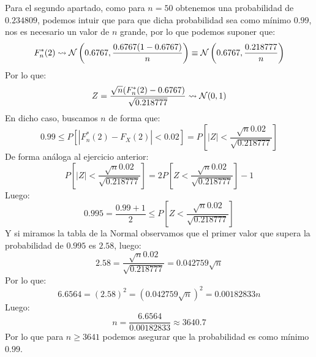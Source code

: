 \begin{ejercicio}
    \noindent
    Para el segundo apartado, como para $n=50$ obtenemos una probabilidad de $0.234809$, podemos intuir que para que dicha probabilidad sea como mínimo $0.99$, nos es necesario un valor de $n$ grande, por lo que podemos suponer que:
    \begin{equation*}
        F_n^\ast(2) \rightsquigarrow \mathcal{N}\left(0.6767, \dfrac{0.6767(1-0.6767)}{n}\right) \equiv \mathcal{N}\left(0.6767, \dfrac{0.218777}{n}\right)
    \end{equation*}
    Por lo que:
    \begin{equation*}
        Z = \dfrac{\sqrt{n}(F_n^\ast(2) - 0.6767)}{\sqrt{0.218777}} \rightsquigarrow\mathcal{N}(0,1)
    \end{equation*}
    En dicho caso, buscamos $n$ de forma que:
    \begin{equation*}
        0.99 \leq P[|F_n^\ast(2) - F_X(2)| < 0.02] = P\left[|Z| < \dfrac{\sqrt{n}0.02}{\sqrt{0.218777}}\right]
    \end{equation*}
    De forma análoga al ejercicio anterior:
    \begin{equation*}
        P\left[|Z| < \dfrac{\sqrt{n}0.02}{\sqrt{0.218777}}\right] = 2P\left[Z < \dfrac{\sqrt{n}0.02}{\sqrt{0.218777}}\right] - 1
    \end{equation*}
    Luego:
    \begin{equation*}
        0.995 = \dfrac{0.99 + 1}{2} \leq P\left[Z < \dfrac{\sqrt{n}0.02}{\sqrt{0.218777}}\right] 
    \end{equation*}
    Y si miramos la tabla de la Normal observamos que el primer valor que supera la probabilidad de $0.995$ es $2.58$, luego:
    \begin{equation*}
        2.58 = \dfrac{\sqrt{n}0.02}{\sqrt{0.218777}} = 0.042759 \sqrt{n}
    \end{equation*}
    Por lo que:
    \begin{equation*}
        6.6564 = {(2.58)}^{2} = {(0.042759 \sqrt{n})}^{2} = 0.00182833 n
    \end{equation*}
    Luego:
    \begin{equation*}
        n = \dfrac{6.6564}{0.00182833} \approx 3640.7
    \end{equation*}
    Por lo que para $n\geq 3641$ podemos asegurar que la probabilidad es como mínimo $0.99$.
\end{ejercicio}

